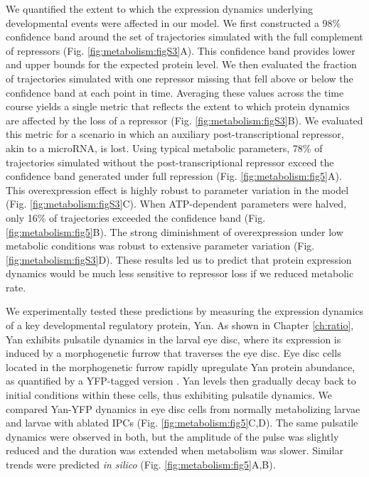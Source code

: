 We quantified the extent to which the expression dynamics underlying developmental events were affected in our model. We first constructed a 98\% confidence band around the set of trajectories simulated with the full complement of repressors (Fig. \ref{fig:metabolism:figS3}A). This confidence band provides lower and upper bounds for the expected protein level. We then evaluated the fraction of trajectories simulated with one repressor missing that fell above or below the confidence band at each point in time. Averaging these values across the time course yields a single metric that reflects the extent to which protein dynamics are affected by the loss of a repressor (Fig. \ref{fig:metabolism:figS3}B). We evaluated this metric for a scenario in which an auxiliary post-transcriptional repressor, akin to a microRNA, is lost. Using typical metabolic parameters, 78\% of trajectories simulated without the post-transcriptional repressor exceed the confidence band generated under full repression (Fig. \ref{fig:metabolism:fig5}A). This overexpression effect is highly robust to parameter variation in the model (Fig. \ref{fig:metabolism:figS3}C). When ATP-dependent parameters were halved, only 16\% of trajectories exceeded the confidence band (Fig. \ref{fig:metabolism:fig5}B). The strong diminishment of overexpression under low metabolic conditions was robust to extensive parameter variation (Fig. \ref{fig:metabolism:figS3}D). These results led us to predict that protein expression dynamics would be much less sensitive to repressor loss if we reduced metabolic rate.

We experimentally tested these predictions by measuring the expression dynamics of a key developmental regulatory protein, Yan. As shown in Chapter \ref{ch:ratio}, Yan exhibits pulsatile dynamics in the larval eye disc, where its expression is induced by a morphogenetic furrow that traverses the eye disc. Eye disc cells located in the morphogenetic furrow rapidly upregulate Yan protein abundance, as quantified by a YFP-tagged version \cite{Pelaez2015a}. Yan levels then gradually decay back to initial conditions within these cells, thus exhibiting pulsatile dynamics. We compared Yan-YFP dynamics in eye disc cells from normally metabolizing larvae and larvae with ablated IPCs (Fig. \ref{fig:metabolism:fig5}C,D). The same pulsatile dynamics were observed in both, but the amplitude of the pulse was slightly reduced and the duration was extended when metabolism was slower. Similar trends were predicted \textit{in silico} (Fig. \ref{fig:metabolism:fig5}A,B).

